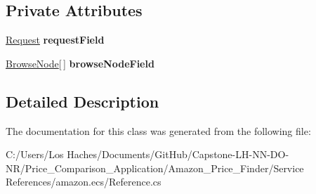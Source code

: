 \subsection*{Private Attributes}
\begin{DoxyCompactItemize}
\item 
\hypertarget{class_price___comparison_1_1amazon_1_1ecs_1_1_browse_nodes_affff6df14bb349447e49dffc3106eaf9}{\hyperlink{class_price___comparison_1_1amazon_1_1ecs_1_1_request}{Request} {\bfseries request\-Field}}\label{class_price___comparison_1_1amazon_1_1ecs_1_1_browse_nodes_affff6df14bb349447e49dffc3106eaf9}

\item 
\hypertarget{class_price___comparison_1_1amazon_1_1ecs_1_1_browse_nodes_a674a5b8dfbe5bf827511d7465ddb1bdb}{\hyperlink{class_price___comparison_1_1amazon_1_1ecs_1_1_browse_node}{Browse\-Node}\mbox{[}$\,$\mbox{]} {\bfseries browse\-Node\-Field}}\label{class_price___comparison_1_1amazon_1_1ecs_1_1_browse_nodes_a674a5b8dfbe5bf827511d7465ddb1bdb}

\end{DoxyCompactItemize}


\subsection{Detailed Description}


The documentation for this class was generated from the following file\-:\begin{DoxyCompactItemize}
\item 
C\-:/\-Users/\-Los Haches/\-Documents/\-Git\-Hub/\-Capstone-\/\-L\-H-\/\-N\-N-\/\-D\-O-\/\-N\-R/\-Price\-\_\-\-Comparison\-\_\-\-Application/\-Amazon\-\_\-\-Price\-\_\-\-Finder/\-Service References/amazon.\-ecs/Reference.\-cs\end{DoxyCompactItemize}
